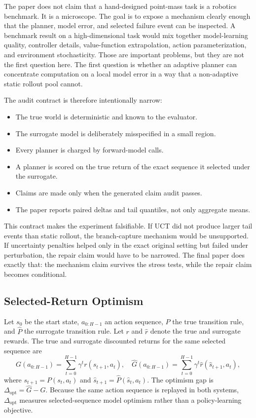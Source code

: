 \documentclass{article}
\newcommand{\gap}{\Delta_{\mathrm{opt}}}
\newcommand{\modelret}{\hat G}
\newcommand{\trueret}{G}
\begin{document}
The paper does not claim that a hand-designed point-mass task is a robotics benchmark. It is a microscope. The goal is to expose a mechanism clearly enough that the planner, model error, and selected failure event can be inspected. A benchmark result on a high-dimensional task would mix together model-learning quality, controller details, value-function extrapolation, action parameterization, and environment stochasticity. Those are important problems, but they are not the first question here. The first question is whether an adaptive planner can concentrate computation on a local model error in a way that a non-adaptive static rollout pool cannot.

The audit contract is therefore intentionally narrow:
\begin{itemize}
\item The true world is deterministic and known to the evaluator.
\item The surrogate model is deliberately misspecified in a small region.
\item Every planner is charged by forward-model calls.
\item A planner is scored on the true return of the exact sequence it selected under the surrogate.
\item Claims are made only when the generated claim audit passes.
\item The paper reports paired deltas and tail quantiles, not only aggregate means.
\end{itemize}

This contract makes the experiment falsifiable. If UCT did not produce larger tail events than static rollout, the branch-capture mechanism would be unsupported. If uncertainty penalties helped only in the exact original setting but failed under perturbation, the repair claim would have to be narrowed. The final paper does exactly that: the mechanism claim survives the stress tests, while the repair claim becomes conditional.

\subsection{Selected-Return Optimism}

Let \(s_0\) be the start state, \(a_{0:H-1}\) an action sequence, \(P\) the true transition rule, and \(\hat P\) the surrogate transition rule. Let \(r\) and \(\hat r\) denote the true and surrogate rewards. The true and surrogate discounted returns for the same selected sequence are
\[
\trueret(a_{0:H-1}) = \sum_{t=0}^{H-1}\gamma^t r(s_{t+1},a_t),
\quad
\modelret(a_{0:H-1}) = \sum_{t=0}^{H-1}\gamma^t \hat r(\hat s_{t+1},a_t),
\]
where \(s_{t+1}=P(s_t,a_t)\) and \(\hat s_{t+1}=\hat P(\hat s_t,a_t)\). The optimism gap is \(\gap=\modelret-\trueret\). Because the same action sequence is replayed in both systems, \(\gap\) measures selected-sequence model optimism rather than a policy-learning objective.
\end{document}
